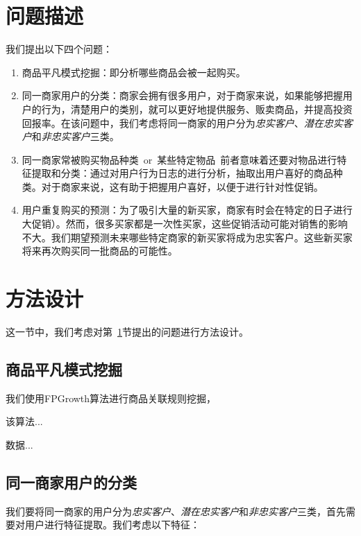 \documentclass{acm_proc_article-sp}
\newcommand{\zap}[1]{}
\newcommand\TODO[1]{{\color{red}{Todo: #1}}}
\newcommand{\TBD}[1]{{\color{blue}#1}}
\begin{document}
\begin{spacing}{1.2}
\zap{
\category{H.4}{Information Systems Applications}{Miscellaneous}
\category{D.2.8}{Software Engineering}{Metrics}[complexity measures, performance measures]
}



\section{问题描述} %
\label{sec:problem}
我们提出以下四个问题：
\begin{enumerate}
  \item 商品平凡模式挖掘：即分析哪些商品会被一起购买。
  \item 同一商家用户的分类：商家会拥有很多用户，对于商家来说，如果能够把握用户的行为，清楚用户的类别，就可以更好地提供服务、贩卖商品，并提高投资回报率。在该问题中，我们考虑将同一商家的用户分为\emph{忠实客户}、\emph{潜在忠实客户}和\emph{非忠实客户}三类。
  \item 同一商家常被购买物品\TBD{种类\ or\ 某些特定物品\  前者意味着还要对物品进行特征提取和分类}：通过对用户行为日志的进行分析，抽取出用户喜好的商品种类。对于商家来说，这有助于把握用户喜好，以便于进行针对性促销。
  \item 用户重复购买的预测：为了吸引大量的新买家，商家有时会在特定的日子进行大促销）。然而，很多买家都是一次性买家，这些促销活动可能对销售的影响不大。我们期望预测未来哪些特定商家的新买家将成为忠实客户。这些新买家将来再次购买同一批商品的可能性。
\end{enumerate}

\section{方法设计}
这一节中，我们考虑对第~\ref{sec:problem}节提出的问题进行方法设计。
\subsection{商品平凡模式挖掘}
我们使用FPGrowth算法进行商品关联规则挖掘，

该算法...\TODO{算法review}

数据...\TODO{描述使用到的数据}

\subsection{同一商家用户的分类}
我们要将同一商家的用户分为\emph{忠实客户}、\emph{潜在忠实客户}和\emph{非忠实客户}三类，首先需要对用户进行特征提取。我们考虑以下特征：\TODO{给一个table}


\end{spacing}
\end{document}
